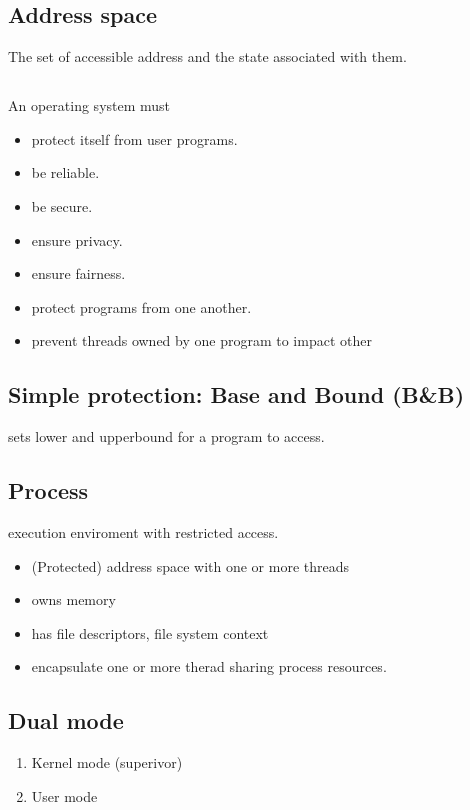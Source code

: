 \subsection{Address space}
The set of accessible address and the state associated with them.

\subsection{}
An operating system must 
\begin{itemize}
    \item protect itself from user programs.
    \item be reliable.
    \item be secure.
    \item ensure privacy.
    \item ensure fairness.
    \item protect programs from one another.
    \item prevent threads owned by one program to impact other
\end{itemize}
\subsection{Simple protection: Base and Bound (B\&B)}
sets lower and upperbound for a program to access.

\subsection{Process}
execution enviroment with restricted access. 
\begin{itemize}
    \item (Protected) address space with one or more threads
    \item owns memory
    \item has file descriptors, file system context
    \item encapsulate one or more therad sharing process resources.
\end{itemize}

\subsection{Dual mode}
\begin{enumerate}
    \item Kernel mode (superivor)
    \item User mode
\end{enumerate}

